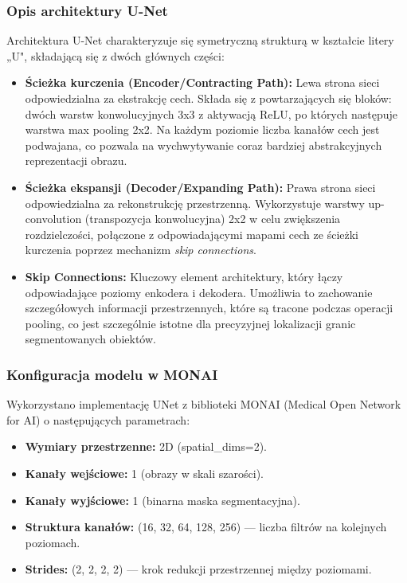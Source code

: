 \documentclass[12pt,a4paper]{article}
\begin{document}
\subsubsection{Opis architektury U-Net}
Architektura U-Net charakteryzuje się symetryczną strukturą w kształcie litery „U", składającą się z dwóch głównych części:

\begin{itemize}
    \item \textbf{Ścieżka kurczenia (Encoder/Contracting Path):} Lewa strona sieci odpowiedzialna za ekstrakcję cech. Składa się z powtarzających się bloków: dwóch warstw konwolucyjnych 3x3 z aktywacją ReLU, po których następuje warstwa max pooling 2x2. Na każdym poziomie liczba kanałów cech jest podwajana, co pozwala na wychwytywanie coraz bardziej abstrakcyjnych reprezentacji obrazu.

    \item \textbf{Ścieżka ekspansji (Decoder/Expanding Path):} Prawa strona sieci odpowiedzialna za rekonstrukcję przestrzenną. Wykorzystuje warstwy up-convolution (transpozycja konwolucyjna) 2x2 w celu zwiększenia rozdzielczości, połączone z odpowiadającymi mapami cech ze ścieżki kurczenia poprzez mechanizm \textit{skip connections}.

    \item \textbf{Skip Connections:} Kluczowy element architektury, który łączy odpowiadające poziomy enkodera i dekodera. Umożliwia to zachowanie szczegółowych informacji przestrzennych, które są tracone podczas operacji pooling, co jest szczególnie istotne dla precyzyjnej lokalizacji granic segmentowanych obiektów.
\end{itemize}

\subsubsection{Konfiguracja modelu w MONAI}
Wykorzystano implementację UNet z biblioteki MONAI (Medical Open Network for AI) o następujących parametrach:
\begin{itemize}
    \item \textbf{Wymiary przestrzenne:} 2D (spatial\_dims=2).
    \item \textbf{Kanały wejściowe:} 1 (obrazy w skali szarości).
    \item \textbf{Kanały wyjściowe:} 1 (binarna maska segmentacyjna).
    \item \textbf{Struktura kanałów:} (16, 32, 64, 128, 256) — liczba filtrów na kolejnych poziomach.
    \item \textbf{Strides:} (2, 2, 2, 2) — krok redukcji przestrzennej między poziomami.
\end{itemize}
\end{document}
